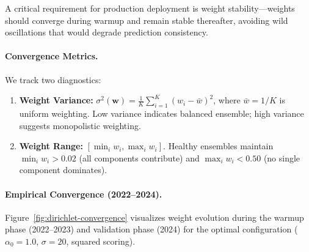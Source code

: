 A critical requirement for production deployment is weight stability---weights should converge during warmup and remain stable thereafter, avoiding wild oscillations that would degrade prediction consistency.

\paragraph{Convergence Metrics.}
We track two diagnostics:
\begin{enumerate}
\item \textbf{Weight Variance:} $\sigma^2(\mathbf{w}) = \frac{1}{K} \sum_{i=1}^K (w_i - \bar{w})^2$, where $\bar{w} = 1/K$ is uniform weighting. Low variance indicates balanced ensemble; high variance suggests monopolistic weighting.

\item \textbf{Weight Range:} $[\min_i w_i, \max_i w_i]$. Healthy ensembles maintain $\min_i w_i > 0.02$ (all components contribute) and $\max_i w_i < 0.50$ (no single component dominates).
\end{enumerate}

\paragraph{Empirical Convergence (2022--2024).}
Figure~\ref{fig:dirichlet-convergence} visualizes weight evolution during the warmup phase (2022--2023) and validation phase (2024) for the optimal configuration ($\alpha_0=1.0$, $\sigma=20$, squared scoring).

